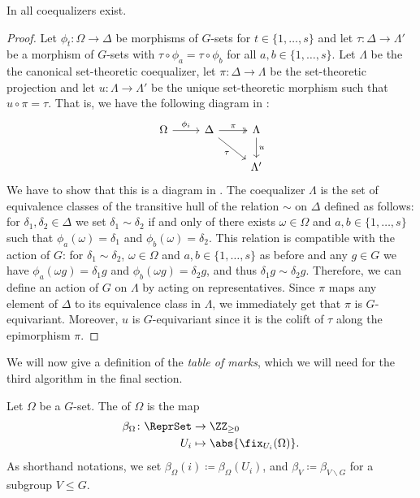 \begin{prop}[Coequalizers]\label{prop:coequalizers_in_G_sets}
In \Gset{} all coequalizers exist.
\end{prop}
\begin{proof}
Let $\phi_t\colon \Omega \to \Delta$ be morphisms of $G$-sets for $t \in \{1,\dots,s\}$ and let $\tau \colon \Delta \to \Lambda'$ be a morphism of $G$-sets with $\tau \circ \phi_a = \tau \circ \phi_b$ for all $a,b \in \{1,\dots,s\}$. Let $\Lambda$ be the the canonical set-theoretic coequalizer, let $\pi\colon \Delta \to \Lambda$ be the set-theoretic projection and let $u\colon \Lambda \to \Lambda'$ be the unique set-theoretic morphism such that $u \circ \pi = \tau$. That is, we have the following diagram in \Set{}:
\[
\begin{tikzcd}
\Omega \arrow[r, "\phi_i"] & \Delta \arrow[r, "\pi", two heads] \arrow[rd, "\tau"'] & \Lambda \arrow[d, "u"] \\
                           &                                                        & \Lambda'              
\end{tikzcd}
\]
We have to show that this is a diagram in \Gset{}. The coequalizer $\Lambda$ is the set of equivalence classes of the transitive hull of the relation $\sim$ on $\Delta$ defined as follows: for $\delta_1,\delta_2 \in \Delta$ we set $\delta_1 \sim \delta_2$ if and only of there exists $\omega \in \Omega$ and $a,b \in \{1,\dots,s\}$ such that $\phi_a(\omega) = \delta_1$ and $\phi_b(\omega) = \delta_2$. This relation is compatible with the action of $G$: for $\delta_1 \sim \delta_2$, $\omega \in \Omega$ and $a,b \in \{1,\dots,s\}$ as before and any $g \in G$ we have $\phi_a(\omega g) = \delta_1 g$ and $\phi_b(\omega g) = \delta_2 g$, and thus $\delta_1 g \sim \delta_2 g$. Therefore, we can define an action of $G$ on $\Lambda$ by acting on representatives. Since $\pi$ maps any element of $\Delta$ to its equivalence class in $\Lambda$, we immediately get that $\pi$ is $G$-equivariant. Moreover, $u$ is $G$-equivariant since it is the colift of $\tau$ along the epimorphism $\pi$.
\end{proof}

We will now give a definition of the \emph{table of marks}, which we will need for the third algorithm in the final section.

\begin{defn}[Mark]
Let $\Omega$ be a $G$-set. The  of $\Omega$ is the map 
\begin{align*}
\beta_\Omega \colon \ReprSet &\to \ZZ_{\geq 0}\\
U_i &\mapsto \abs{\fix_{U_i}(\Omega)}.
\end{align*}
As shorthand notations, we set $\beta_\Omega(i) \coloneqq \beta_\Omega(U_i)$, and $\beta_V \coloneqq \beta_{V \backslash G}$ for a subgroup $V \leq G$.
\end{defn}

